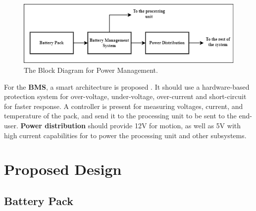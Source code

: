 \begin{figure}[h!]
    \centering
    \includegraphics[scale=0.5]{./Figures/HW/powerDiagram-drawio.png}
    \caption{The Block Diagram for Power Management.}
    \label{fig:hw-power-blk1}
\end{figure}



For the \textbf{BMS}, a smart architecture is proposed . It should use a hardware-based protection  system for over-voltage, under-voltage, over-current and short-circuit for faster response. 
\newline A controller is present for measuring voltages, current, and temperature of the pack, and send it to the processing unit to be sent to the end-user. \cite{bms_david}\textbf{Power distribution} should provide 12V for motion, as well as 5V with high current capabilities for to power the processing unit and other subsystems.


\section{Proposed Design}
\subsection{Battery Pack}\label{subsection:battery}

